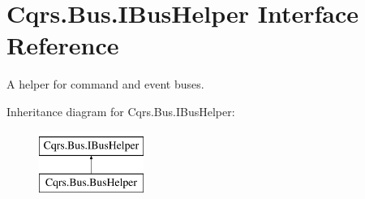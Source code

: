 \hypertarget{interfaceCqrs_1_1Bus_1_1IBusHelper}{}\section{Cqrs.\+Bus.\+I\+Bus\+Helper Interface Reference}
\label{interfaceCqrs_1_1Bus_1_1IBusHelper}


A helper for command and event buses.  


Inheritance diagram for Cqrs.\+Bus.\+I\+Bus\+Helper\+:\begin{figure}[H]
\begin{center}
\leavevmode
\includegraphics[height=2.000000cm]{interfaceCqrs_1_1Bus_1_1IBusHelper}
\end{center}
\end{figure}
